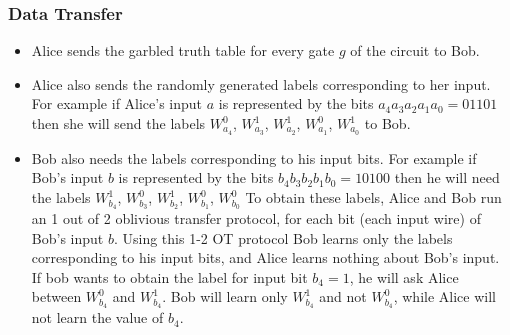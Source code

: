 \subsubsection{Data Transfer}
\begin{itemize}
  \item Alice sends the garbled truth table for every gate $g$ of the circuit to Bob.
  \item Alice also sends the randomly generated labels corresponding to her input.
  For example if Alice's input $a$ is represented by the bits $a_4a_3a_2a_1a_0 = 01101$ then she will send the labels $W_{a_4}^0$, $W_{a_3}^1$, $W_{a_2}^1$, $W_{a_1}^0$, $W_{a_0}^1$ to Bob.
  \item Bob also needs the labels corresponding to his input bits. For example if Bob's input $b$ is represented by the bits $b_4b_3b_2b_1b_0 = 10100$ then he will need the labels $W_{b_4}^1$, $W_{b_3}^0$, $W_{b_2}^1$, $W_{b_1}^0$, $W_{b_0}^0$
  To obtain these labels, Alice and Bob run an 1 out of 2 oblivious transfer protocol, for each bit (each input wire) of Bob's input $b$.
  Using this 1-2 OT protocol Bob learns only the labels corresponding to his input bits, and Alice learns nothing about Bob's input.
  If bob wants to obtain the label for input bit $b_4 = 1$, he will ask Alice between $W_{b_4}^0$ and $W_{b_4}^1$.
  Bob will learn only $W_{b_4}^1$ and not $W_{b_4}^0$, while Alice will not learn the value of $b_4$.
\end{itemize}
